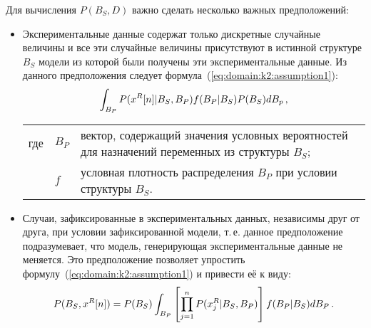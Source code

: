 Для вычисления $P(B_S, D)$ важно сделать несколько важных предположений:

\begin{itemize}
  \item
  Экспериментальные данные содержат только дискретные случайные величины и все эти случайные величины присутствуют в истинной структуре $B_S$ модели из которой были получены эти экспериментальные данные.
  Из данного предположения следует формула~(\ref{eq:domain:k2:assumption1}):
  \begin{equation}
    \label{eq:domain:k2:assumption1}
    \int_{B_P} P(x^R[n] | B_S, B_P) f(B_P | B_S) P(B_S) dB_p \text{\,,}
  \end{equation}
  \par\hspace{\fivecharsapprox} %
  \begin{tabular}{@{}ll@{ --- }p{}}
  где & $ B_P $ & вектор, содержащий значения условных вероятностей для назначений переменных из структуры $ B_S $; \\
      & $ f $ & условная плотность распределения $B_P$ при условии структуры $B_S$. \\[\parsep]
  \end{tabular}

  \item
  Случаи, зафиксированные в экспериментальных данных, независимы друг от друга, при условии зафиксированной модели, т.\,е. данное предположение подразумевает, что модель, генерирующая экспериментальные данные не меняется.
  Это предположение позволяет упростить формулу~(\ref{eq:domain:k2:assumption1}) и привести её к виду:
  \begin{equation}
    \label{eq:domain:k2:assumption2}
    P(B_S, x^R[n]) =
      P(B_S) \int_{B_P} \left[ \prod_{j = 1}^{n} P(x^R_j | B_S, B_P) \right] f(B_P | B_S) dB_P \text{\,.}
  \end{equation}


\end{itemize}
